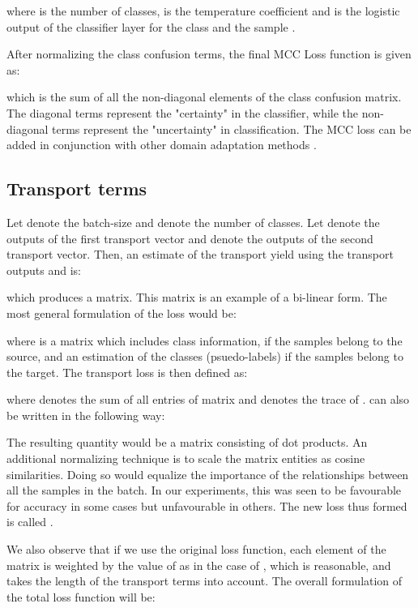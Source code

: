\documentclass[10pt,twocolumn,letterpaper]{article}
\begin{document}
 
where  is the number of classes,  is the temperature coefficient and  is the logistic output of the classifier layer for the class  and the sample . 

After normalizing the class confusion terms, the final MCC Loss function is given as:
 
which is the sum of all the non-diagonal elements of the class confusion matrix. The diagonal terms represent the "certainty" in the classifier, while the non-diagonal terms represent the "uncertainty" in classification. The MCC loss can be added in conjunction with other domain adaptation methods \cite{mcc}.


 
\subsection{Transport terms}

Let  denote the batch-size and  denote the number of classes. Let  denote the outputs of the first transport vector and  denote the outputs of the second transport vector. Then, an estimate of the transport yield  using the transport outputs  and  is:

which produces a  matrix. This matrix is an example of a bi-linear form. The most general formulation of the loss would be: 

where  is a matrix which includes class information, if the samples belong to the source, and an estimation of the classes (psuedo-labels) if the samples belong to the target. The transport loss  is then defined as: 

where   denotes the sum of all entries of matrix  and   denotes the trace of .   can also be written in the following way:\

The resulting quantity would be a  matrix consisting of dot products. An additional normalizing technique is to scale the matrix entities as cosine similarities. Doing so would equalize the importance of the relationships between all the samples in the batch. In our experiments, this was seen to be favourable for accuracy in some cases but unfavourable in others.  The new loss thus formed is called . 

We also observe that if we use the original loss function, each element of the matrix  is weighted by the value of  as in the case of , which is reasonable, and takes the length of the transport terms into account. The overall formulation of the total loss function will be: 
\end{document}
